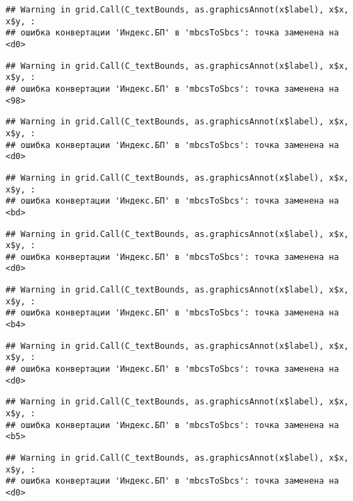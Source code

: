 \documentclass[
]{article}
\begin{document}
\begin{verbatim}
## Warning in grid.Call(C_textBounds, as.graphicsAnnot(x$label), x$x, x$y, :
## ошибка конвертации 'Индекс.БП' в 'mbcsToSbcs': точка заменена на <d0>
\end{verbatim}

\begin{verbatim}
## Warning in grid.Call(C_textBounds, as.graphicsAnnot(x$label), x$x, x$y, :
## ошибка конвертации 'Индекс.БП' в 'mbcsToSbcs': точка заменена на <98>
\end{verbatim}

\begin{verbatim}
## Warning in grid.Call(C_textBounds, as.graphicsAnnot(x$label), x$x, x$y, :
## ошибка конвертации 'Индекс.БП' в 'mbcsToSbcs': точка заменена на <d0>
\end{verbatim}

\begin{verbatim}
## Warning in grid.Call(C_textBounds, as.graphicsAnnot(x$label), x$x, x$y, :
## ошибка конвертации 'Индекс.БП' в 'mbcsToSbcs': точка заменена на <bd>
\end{verbatim}

\begin{verbatim}
## Warning in grid.Call(C_textBounds, as.graphicsAnnot(x$label), x$x, x$y, :
## ошибка конвертации 'Индекс.БП' в 'mbcsToSbcs': точка заменена на <d0>
\end{verbatim}

\begin{verbatim}
## Warning in grid.Call(C_textBounds, as.graphicsAnnot(x$label), x$x, x$y, :
## ошибка конвертации 'Индекс.БП' в 'mbcsToSbcs': точка заменена на <b4>
\end{verbatim}

\begin{verbatim}
## Warning in grid.Call(C_textBounds, as.graphicsAnnot(x$label), x$x, x$y, :
## ошибка конвертации 'Индекс.БП' в 'mbcsToSbcs': точка заменена на <d0>
\end{verbatim}

\begin{verbatim}
## Warning in grid.Call(C_textBounds, as.graphicsAnnot(x$label), x$x, x$y, :
## ошибка конвертации 'Индекс.БП' в 'mbcsToSbcs': точка заменена на <b5>
\end{verbatim}

\begin{verbatim}
## Warning in grid.Call(C_textBounds, as.graphicsAnnot(x$label), x$x, x$y, :
## ошибка конвертации 'Индекс.БП' в 'mbcsToSbcs': точка заменена на <d0>
\end{verbatim}
\end{document}
